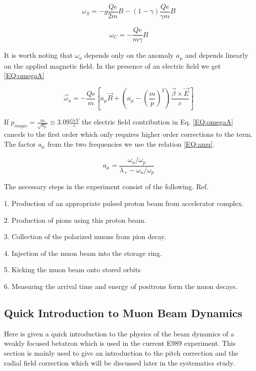 \documentclass[./Thesis]{subfiles}
\begin{document}
	\begin{equation}\label{EQ:omegaS}
	\omega_{S} = -g \frac{Qe}{2m} B - (1-\gamma)\frac{Qe}{\gamma m} B
	\end{equation}

	\begin{equation}\label{EQ:omegaC}
	\omega_C = - \frac{Qe}{m\gamma} B
	\end{equation}

It is worth noting that $\omega_a$ depends only on the anomaly $a_\mu$ and depends linearly on the applied magnetic field.  In the presence of an electric field we get \ref{EQ:omegaA}

\begin{equation}\label{EQ:omegaA}
\vec{\omega}_a = -\frac{Qe}{m}[a_{\mu} \vec{B} + (a_{\mu} - (\frac{m}{p})^2) \frac{\vec{\beta} \times \vec{E}}{c}]
\end{equation}


If $p_{magic} = \frac{m}{\sqrt{a_\mu}} \equiv 3.09 \frac{GeV}{c}$ the electric field contribution in Eq. \ref{EQ:omegaA} cancels to the first order which only requires higher order corrections to the term. The factor $a_\mu$ from the two frequencies we use the relation \ref{EQ:amu}.

\begin{equation}\label{EQ:amu}
a_\mu = \frac{\omega_a / \omega_p}{\lambda_{+} - \omega_a / \omega_p}
\end{equation}

The necessary steps in the experiment consist of the following.  Ref.\cite{TDR}


1.	Production of an appropriate pulsed proton beam from accelerator complex.

2.	Production of pions using this proton beam.

3. 	Collection of the polarized muons from pion decay.

4. 	Injection of the muon beam into the storage ring.

5. 	Kicking the muon beam onto stored orbits

6.	Measuring the arrival time and energy of positrons form the muon decays.


\vspace{5mm}

\subsection{Quick Introduction to Muon Beam Dynamics}

	Here is given a quick introduction to the physics of the beam dynamics of a weakly focused betatron which is used in the current E989 experiment.  This section is mainly used to give an introduction to the pitch correction and the radial field correction which will be discussed later in the systematics study. 
\end{document}
